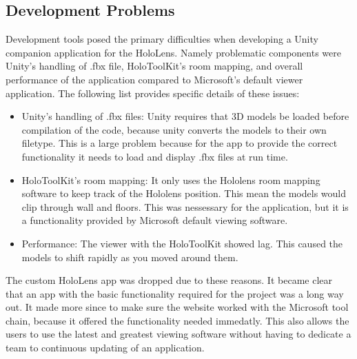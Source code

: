     \subsection{Development Problems}
    Development tools posed the primary difficulties when developing a Unity companion application for the HoloLens. Namely problematic components were Unity's handling of .fbx file, HoloToolKit's room mapping, and overall performance of the application compared to Microsoft's default viewer application.
    The following list provides specific details of these issues:
    \begin{itemize}
        \item Unity's handling of .fbx files: Unity requires that 3D models be loaded before compilation of the code, because unity converts the models to their own filetype.
        This is a large problem because for the app to provide the correct functionality it needs to load and display .fbx files at run time.
        \item HoloToolKit's room mapping: It only uses the Hololens room mapping software to keep track of the Hololens position.
        This mean the models would clip through wall and floors. This was nessessary for the application, but it is a functionality provided by Microsoft default viewing software.
        \item Performance: The viewer with the HoloToolKit showed lag. This caused the models to shift rapidly as you moved around them. 
    \end{itemize}

    The custom HoloLens app was dropped due to these reasons. It became clear that an app with the basic functionality required for the project was a long way out.
    It made more since to make sure the website worked with the Microsoft tool chain, because it offered the functionality needed immedatly.
    This also allows the users to use the latest and greatest viewing software without having to dedicate a team to continuous updating of an application.
